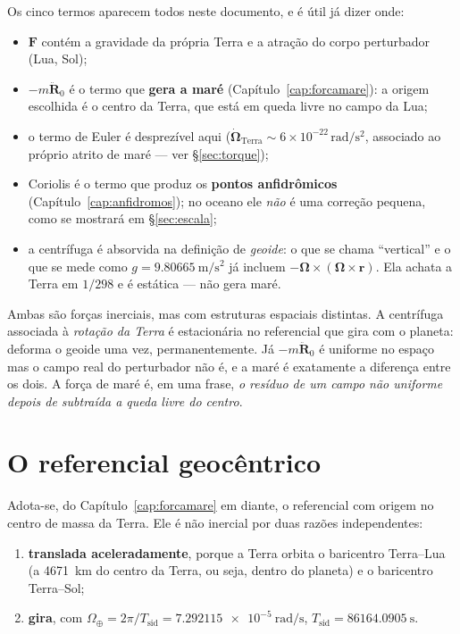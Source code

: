 \documentclass[11pt,a4paper,oneside]{report}
\theoremstyle{definition}
\theoremstyle{plain}
\theoremstyle{remark}
\newcommand{\vect}[1]{\bm{#1}}
\begin{document}
Os cinco termos aparecem todos neste documento, e é útil já dizer onde:

\begin{itemize}
\item $\vect{F}$ contém a gravidade da própria Terra e a atração do corpo
  perturbador (Lua, Sol);
\item $-m\ddot{\vect{R}}_0$ é o termo que \textbf{gera a maré}
  (Capítulo~\ref{cap:forcamare}): a origem escolhida é o centro da Terra, que
  está em queda livre no campo da Lua;
\item o termo de Euler é desprezível aqui ($\dot{\vect\Omega}_{\text{Terra}}\sim
  6\times10^{-22}\,\si{\radian\per\second\squared}$, associado ao próprio atrito de
  maré — ver \S\ref{sec:torque});
\item Coriolis é o termo que produz os \textbf{pontos anfidrômicos}
  (Capítulo~\ref{cap:anfidromos}); no oceano ele \emph{não} é uma correção
  pequena, como se mostrará em \S\ref{sec:escala};
\item a centrífuga é absorvida na definição de \emph{geoide}: o que se chama
  ``vertical'' e o que se mede como $g=\SI{9.80665}{\meter\per\second\squared}$
  já incluem $-\vect{\Omega}\times(\vect{\Omega}\times\vect{r})$. Ela achata a
  Terra em $1/298$ e é estática — não gera maré.
\end{itemize}

\begin{caixa}
Ambas são forças inerciais, mas com estruturas espaciais distintas. A
centrífuga associada à \emph{rotação da Terra} é estacionária no referencial
que gira com o planeta: deforma o geoide uma vez, permanentemente. Já
$-m\ddot{\vect{R}}_0$ é uniforme no espaço mas o campo real do perturbador não
é, e a maré é exatamente a diferença entre os dois. A força de maré é, em uma
frase, \emph{o resíduo de um campo não uniforme depois de subtraída a queda
livre do centro}.
\end{caixa}

\section{O referencial geocêntrico}
\label{sec:geocentrico}

Adota-se, do Capítulo~\ref{cap:forcamare} em diante, o referencial com origem
no centro de massa da Terra. Ele é não inercial por duas razões independentes:

\begin{enumerate}
\item \textbf{translada aceleradamente}, porque a Terra orbita o baricentro
  Terra--Lua (a \SI{4671}{\kilo\meter} do centro da Terra, ou seja, dentro do
  planeta) e o baricentro Terra--Sol;
\item \textbf{gira}, com
  $\Omega_\oplus=2\pi/T_{\text{sid}}=\SI{7.292115e-5}{\radian\per\second}$,
  $T_{\text{sid}}=\SI{86164.0905}{\second}$.
\end{enumerate}
\end{document}
